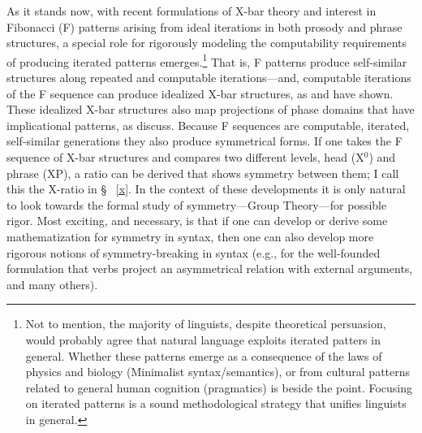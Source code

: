 \documentclass[11pt,twoside]{article}
\begin{document}
As it stands now, with recent formulations of X-bar theory and interest in Fibonacci (F) patterns arising from ideal iterations in both prosody and phrase structures, a special role for rigorously modeling the computability requirements of producing iterated patterns emerges.\footnote{Not to mention, the majority of linguists, despite theoretical persuasion, would probably agree that natural language exploits iterated patters in general. Whether these patterns emerge as a consequence of the laws of physics and biology (Minimalist syntax/semantics), or from cultural patterns related to general human cognition (pragmatics) is beside the point. Focusing on iterated patterns is a sound methodological strategy that unifies linguists in general.} That is, F patterns produce self-similar structures along repeated and computable iterations---and, computable iterations of the F sequence can produce idealized X-bar structures, as \cite{medeiros:2008} and \cite{soschen:2008} have shown. These idealized X-bar structures also map projections of phase domains that have implicational patterns, as \cite{ppuriagereka:2008} discuss. Because F sequences are computable, iterated, self-similar generations they also produce symmetrical forms. If one takes the F sequence of X-bar structures and compares two different levels, head (X$^{0}$) and phrase (XP), a ratio can be derived that shows symmetry between them; I call this the X-ratio in \S~ \ref{x}. In the context of these developments it is only natural to look towards the formal study of symmetry---Group Theory---for possible rigor. Most exciting, and necessary, is that if one can develop or derive some mathematization for symmetry in syntax, then one can also develop more rigorous notions of symmetry-breaking in syntax (e.g., for the well-founded formulation that verbs project an asymmetrical relation with external arguments, and many others).
\end{document}
